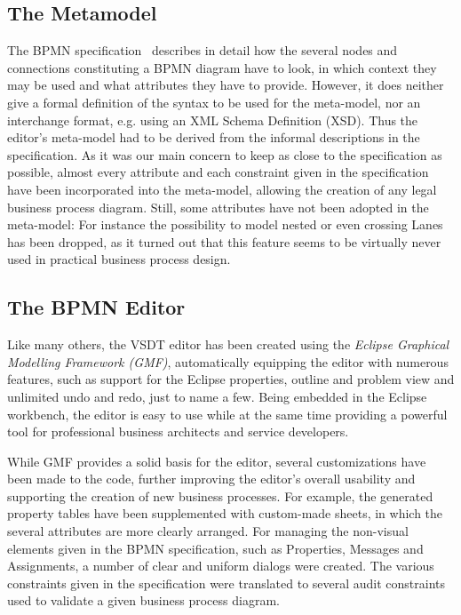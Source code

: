 \subsection{The Metamodel}

The BPMN specification~\cite{omg2009bpmn} describes in detail how the several
nodes and connections constituting a BPMN diagram have to look, in which context
they may be used and what attributes they have to provide.  However, it does
neither give a formal definition of the syntax to be used for the meta-model, nor
an interchange format, e.g. using an XML Schema Definition (XSD).  Thus the
editor's meta-model had to be derived from the informal descriptions in the
specification.  As it was our main concern to keep as close to the specification
as possible, almost every attribute and each constraint given in the specification
have been incorporated into the meta-model, allowing the creation of any legal
business process diagram.  Still, some attributes have not been adopted in the
meta-model: For instance the possibility to model nested or even crossing Lanes
has been dropped, as it turned out that this feature seems to be virtually never
used in practical business process design.


\subsection{The BPMN Editor}

Like many others, the VSDT editor has been created using the \emph{Eclipse Graphical
Modelling Framework (GMF)}, automatically equipping the editor with numerous
features, such as support for the Eclipse properties, outline and problem view
and unlimited undo and redo, just to name a few.  Being embedded in the Eclipse
workbench, the editor is easy to use while at the same time providing a powerful
tool for professional business architects and service developers.

While GMF provides a solid basis for the editor, several customizations have been
made to the code, further improving the editor's overall usability and supporting
the creation of new business processes.  For example, the generated property
tables have been supplemented with custom-made sheets, in which the several
attributes are more clearly arranged.  For managing the non-visual elements given
in the BPMN specification, such as Properties, Messages and Assignments, a number
of clear and uniform dialogs were created.  The various constraints given in the
specification were translated to several audit constraints used to validate a
given business process diagram.


